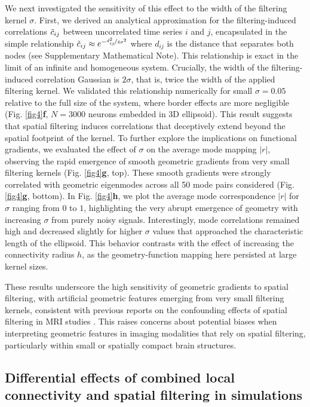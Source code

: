 \documentclass{article}
\begin{document}
 We next investigated the sensitivity of this effect to the width of the filtering kernel $\sigma$. First, we derived an analytical approximation for the filtering-induced correlations $\Tilde{c}_{ij}$ between uncorrelated time series $i$ and $j$, encapsulated in the simple relationship $\Tilde{c}_{ij}\approx e^{-\nicefrac{d_{ij}^2}{4\sigma^2}}$ where $d_{ij}$ is the distance that separates both nodes (see Supplementary Mathematical Note). This relationship is exact in the limit of an infinite and homogeneous system. Crucially, the width of the filtering-induced correlation Gaussian is $2\sigma$, that is, twice the width of the applied filtering kernel. We validated this relationship numerically for small $\sigma=0.05$ relative to the full size of the system, where border effects are more negligible (Fig. \ref{fig4}\textbf{f}, $N=3000$ neurons embedded in 3D ellipsoid). This result suggests that spatial filtering induces correlations that deceptively extend beyond the spatial footprint of the kernel. To further explore the implications on functional gradients, we evaluated the effect of $\sigma$ on the average mode mapping $|r|$, observing the rapid emergence of smooth geometric gradients from very small filtering kernels (Fig. \ref{fig4}\textbf{g}, top). These smooth gradients were strongly correlated with geometric eigenmodes across all 50 mode pairs considered (Fig. \ref{fig4}\textbf{g}, bottom). In Fig. \ref{fig4}\textbf{h}, we plot the average mode correspondence $|r|$ for $\sigma$ ranging from $0$ to $1$, highlighting the very abrupt emergence of geometry with increasing $\sigma$ from purely noisy signals. Interestingly, mode correlations remained high and decreased slightly for higher $\sigma$ values that approached the characteristic length of the ellipsoid. This behavior contrasts with the effect of increasing the connectivity radius $h$, as the geometry-function mapping here persisted at large kernel sizes.
 
 These results underscore the high sensitivity of geometric gradients to spatial filtering, with artificial geometric features emerging from very small filtering kernels, consistent with previous reports on the confounding effects of spatial filtering in MRI studies \cite{watson2023connectopic}. This raises concerns about potential biases when interpreting geometric features in imaging modalities that rely on spatial filtering, particularly within small or spatially compact brain structures.

\subsection*{Differential effects of combined local connectivity and spatial filtering in simulations}
\end{document}
